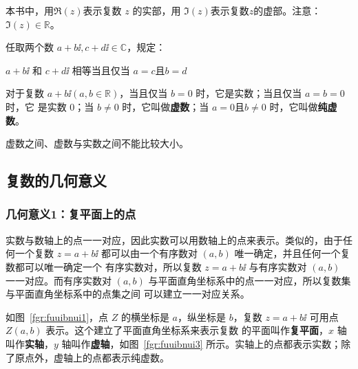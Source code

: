 \documentclass[a4paper,openany]{ctexbook}
\begin{document}
本书中，用\(\Re(z)\)表示复数 \(z\) 的实部，用 \(\Im(z)\)表示复数\(z\)的虚部。注意：\(\Im(z)\in \mathbb{R} \)。

任取两个数 \(a+b \ii,c+d \ii\in \mathbb{C}\)，规定：

\centerline{\(a+b \ii\) 和 \(c+d \ii\) 相等当且仅当 \(a=c\text{且} b=d\)}

对于复数 \(a+b \ii(a,b\in \mathbb{R})\)，当且仅当 \(b=0\) 时，它是实数；当且仅当 \(a=b=0\) 时，它
是实数 \(0\)；当 \(b \ne 0\) 时，它叫做\textbf{虚数}；当 \(a=0 \text{且} b \ne 0\) 时，它叫做\textbf{纯虚数}。

虚数之间、虚数与实数之间不能比较大小。

\subsection{复数的几何意义}

\subsubsection{几何意义1：复平面上的点}

实数与数轴上的点一一对应，因此实数可以用数轴上的点来表示。类似的，由于任何一个复数 \(z=a+b \ii\) 都可以由一个有序数对 \((a,b)\) 唯一确定，并且任何一个复数都可以唯一确定一个
有序实数对，所以复数 \(z=a+b \ii\) 与有序实数对 \((a,b)\) 一一对应。而有序实数对 \((a,b)\) 与平面直角坐标系中的点一一对应，所以复数集与平面直角坐标系中的点集之间
可以建立一一对应关系。

如图~\ref{fgr:fuuibnui1}，点 \(Z\) 的横坐标是 \(a\)，纵坐标是 \(b\)，复数 \(z=a+b \ii\) 可用点 \(Z(a,b)\) 表示。这个建立了平面直角坐标系来表示复数
的平面叫作\textbf{复平面}，\(x\) 轴叫作\textbf{实轴}，\(y\) 轴叫作\textbf{虚轴}，如图~\ref{fgr:fuuibnui3} 所示。实轴上的点都表示实数；除了原点外，虚轴上的点都表示纯虚数。
\end{document}
